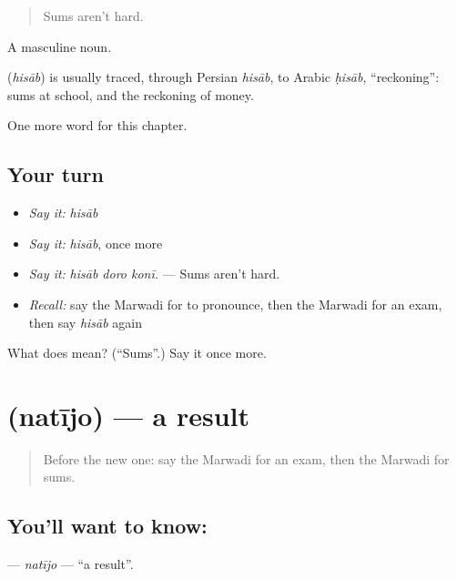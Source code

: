 \begin{quote}
Sums aren't hard.
\end{quote}

A masculine noun.

\begin{cousinweb}
\textbf{} (\emph{hisāb}) is usually traced, through Persian \emph{hisāb}, to Arabic \emph{ḥisāb}, \textquotedblleft{}reckoning\textquotedblright{}: sums at school, and the reckoning of money.
\end{cousinweb}

\begin{grammarlens}[title={What you've built}]
One more word for this chapter.
\end{grammarlens}

\subsection*{Your turn}
\begin{itemize}
\raggedright
  \item \emph{Say it:} \emph{hisāb}
  \item \emph{Say it:} \emph{hisāb}, once more
  \item \emph{Say it:} \emph{hisāb doro konī.} — Sums aren't hard.
  \item \emph{Recall:} say the Marwadi for to pronounce, then the Marwadi for an exam, then say \emph{hisāb} again
\end{itemize}

\begin{tcolorbox}[breakable,colback=teal!4,colframe=teal!35!black,title={Before you move on}]
What does  mean? (\textquotedblleft{}Sums\textquotedblright{}.) Say it once more.
\end{tcolorbox}
\section[\texorpdfstring{\mw{नतीजो} (natījo)}{नतीजो (natījo)}]{ (natījo) — a result}

\label{lesson:MW-C286-natijo}



\begin{quote}
Before the new one: say the Marwadi for an exam, then the Marwadi for sums.
\end{quote}

\subsection*{You'll want to know: }
\textbf{} — \emph{natījo} — \textquotedblleft{}a result\textquotedblright{}.

